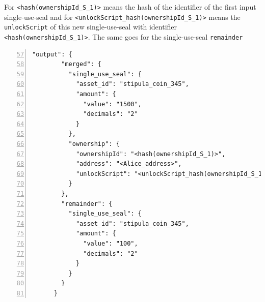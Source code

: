\begin{enumerate}
  For \verb|<hash(ownershipId_S_1)>| means the hash of the identifier of the first input single-use-seal 
  and for \verb|<unlockScript_hash(ownershipId_S_1)>| means the \verb|unlockScript| of this new 
  single-use-seal with identifier \verb|<hash(ownershipId_S_1)>|. The same goes for the single-use-seal 
  \verb|remainder|
  \begin{Verbatim}[numbers=left,xleftmargin=1cm,firstnumber=57,breaklines=true,tabsize=2]
      "output": {
        "merged": {
          "single_use_seal": {
            "asset_id": "stipula_coin_345",
            "amount": {
              "value": "1500",
              "decimals": "2"
            }
          },
          "ownership": {
            "ownershipId": "<hash(ownershipId_S_1)>",  
            "address": "<Alice_address>",
            "unlockScript": "<unlockScript_hash(ownershipId_S_1)>"
          }
        },
        "remainder": {
          "single_use_seal": {
            "asset_id": "stipula_coin_345",
            "amount": {
              "value": "100",
              "decimals": "2"
            }
          }
        }
      }
  \end{Verbatim}
\end{enumerate}

